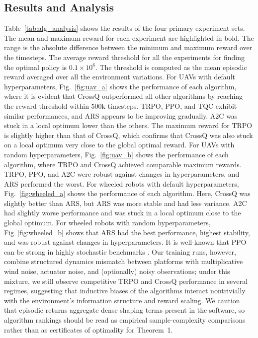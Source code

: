 \documentclass{article}
\begin{document}
\subsection{Results and Analysis}
Table~\ref{tab:alg_analysis} shows the results of the four primary experiment sets. The mean and maximum reward for each experiment are highlighted in bold. The range is the absolute difference between the minimum and maximum reward over the timesteps. The average reward threshold for all the experiments for finding the optimal policy is $0.1 \times 10^6$. The threshold is computed as the mean episodic reward averaged over all the environment variations. For UAVs with default hyperparameters, Fig.~\ref{fig:uav_a} shows the performance of each algorithm, where it is evident that CrossQ outperformed all other algorithms by reaching the reward threshold within 500k timesteps. TRPO, PPO, and TQC exhibit similar performances, and ARS appears to be improving gradually. A2C was stuck in a local optimum lower than the others. The maximum reward for TRPO is slightly higher than that of CrossQ, which confirms that CrossQ was also stuck on a local optimum very close to the global optimal reward. For UAVs with random hyperparameters, Fig.~\ref{fig:uav_b} shows the performance of each algorithm, where TRPO and CrossQ achieved comparable maximum rewards. TRPO, PPO, and A2C were robust against changes in hyperparameters, and ARS performed the worst. For wheeled robots with default hyperparameters, Fig.~\ref{fig:wheeled_a} shows the performance of each algorithm. Here, CrossQ was slightly better than ARS, but ARS was more stable and had less variance. A2C had slightly worse performance and was stuck in a local optimum close to the global optimum. For wheeled robots with random hyperparameters, Fig~\ref{fig:wheeled_b} shows that ARS had the best performance, highest stability, and was robust against changes in hyperparameters.
It is well-known that PPO can be strong in highly stochastic benchmarks \citep{schulman2017ppo, henderson2018deep}. Our training runs, however, combine structured dynamics mismatch between platforms with multiplicative wind noise, actuator noise, and (optionally) noisy observations; under this mixture, we still observe competitive TRPO and CrossQ performance in several regimes, suggesting that inductive biases of the algorithms interact nontrivially with the environment's information structure and reward scaling. We caution that episodic returns aggregate dense shaping terms present in the software, so algorithm rankings should be read as empirical sample-complexity comparisons rather than as certificates of optimality for Theorem~1.
\end{document}
